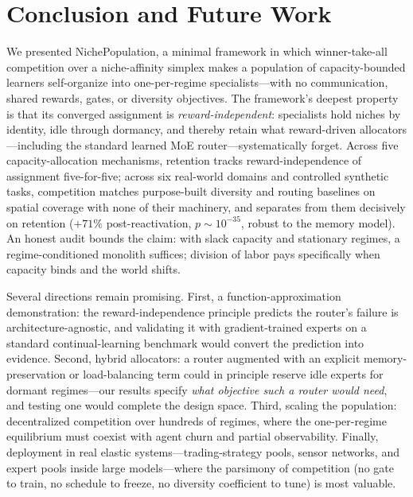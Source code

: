 \documentclass[11pt]{article}
\begin{document}
\section{Conclusion and Future Work}

We presented NichePopulation, a minimal framework in which winner-take-all
competition over a niche-affinity simplex makes a population of capacity-bounded
learners self-organize into one-per-regime specialists---with no communication,
shared rewards, gates, or diversity objectives. The framework's deepest property
is that its converged assignment is \emph{reward-independent}: specialists hold
niches by identity, idle through dormancy, and thereby retain what reward-driven
allocators---including the standard learned MoE router---systematically forget.
Across five capacity-allocation mechanisms, retention tracks
reward-independence of assignment five-for-five; across six real-world domains
and controlled synthetic tasks, competition matches purpose-built diversity and
routing baselines on spatial coverage with none of their machinery, and
separates from them decisively on retention ($+71\%$ post-reactivation,
$p\sim10^{-35}$, robust to the memory model). An honest audit bounds the claim:
with slack capacity and stationary regimes, a regime-conditioned monolith
suffices; division of labor pays specifically when capacity binds and the world
shifts.

Several directions remain promising. First, a function-approximation
demonstration: the reward-independence principle predicts the router's failure
is architecture-agnostic, and validating it with gradient-trained experts on a
standard continual-learning benchmark would convert the prediction into
evidence. Second, hybrid allocators: a router augmented with an explicit
memory-preservation or load-balancing term could in principle reserve idle
experts for dormant regimes---our results specify \emph{what objective such a
router would need}, and testing one would complete the design space. Third,
scaling the population: decentralized competition over hundreds of regimes,
where the one-per-regime equilibrium must coexist with agent churn and partial
observability. Finally, deployment in real elastic systems---trading-strategy
pools, sensor networks, and expert pools inside large models---where the
parsimony of competition (no gate to train, no schedule to freeze, no diversity
coefficient to tune) is most valuable.



\end{document}
